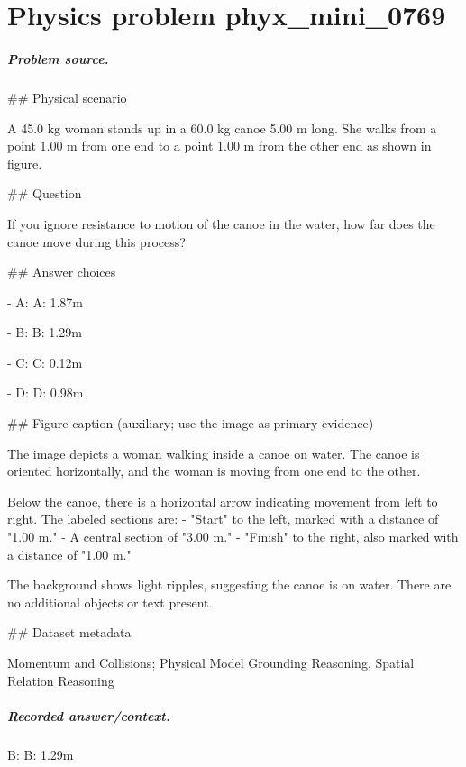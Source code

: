 
\chapter{Physics problem phyx\_mini\_0769}
\label{ch:PhyXMiniProblems_problem_phyx_mini_0769}

\paragraph{Problem source.}
\#\# Physical scenario

A 45.0 kg woman stands up in a 60.0 kg canoe 5.00 m long. She walks from a point 1.00 m from one end to a point 1.00 m from the other end as shown in figure.

\#\# Question

If you ignore resistance to motion of the canoe in the water, how far does the canoe move during this process?

\#\# Answer choices

- A: A: 1.87m

- B: B: 1.29m

- C: C: 0.12m

- D: D: 0.98m

\#\# Figure caption (auxiliary; use the image as primary evidence)

The image depicts a woman walking inside a canoe on water. The canoe is oriented horizontally, and the woman is moving from one end to the other. 

Below the canoe, there is a horizontal arrow indicating movement from left to right. The labeled sections are:
- "Start" to the left, marked with a distance of "1.00 m."
- A central section of "3.00 m."
- "Finish" to the right, also marked with a distance of "1.00 m."

The background shows light ripples, suggesting the canoe is on water. There are no additional objects or text present.

\#\# Dataset metadata

Momentum and Collisions; Physical Model Grounding Reasoning, Spatial Relation Reasoning

\paragraph{Recorded answer/context.}
B: B: 1.29m

